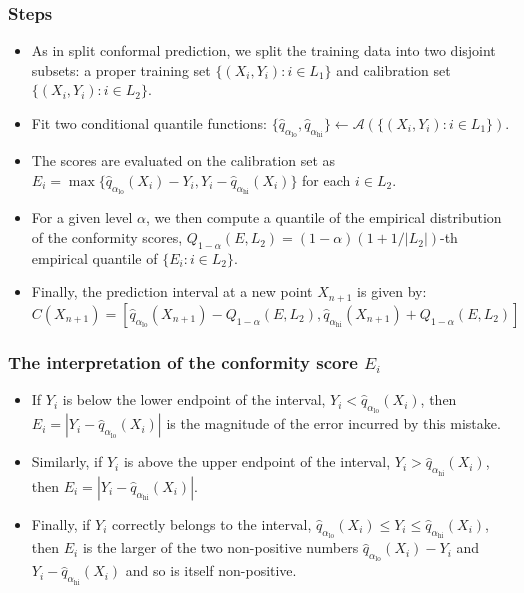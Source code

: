 \documentclass[11pt,a4paper]{article}
\begin{document}
\subsubsection{Steps}
\begin{itemize}
    \item As in split conformal prediction, we split the training data into two disjoint subsets: a proper training set \mbox{$\{(X_i, Y_i) : i \in L_1\}$} and calibration set $\{(X_i, Y_i) : i \in L_2\}$.
    \item Fit two conditional quantile functions: $\{\hat{q}_{\alpha_{\text{lo}}}, \hat{q}_{\alpha_{\text{hi}}}\} \leftarrow \mathcal{A}(\{(X_i, Y_i) : i \in L_1\})$.
    \item The scores are evaluated on the calibration set as $E_i = \max\{\hat{q}_{\alpha_{\text{lo}}}(X_i) - Y_i, Y_i - \hat{q}_{\alpha_{\text{hi}}}(X_i)\}$ for each $i \in L_2$.
    \item For a given level $\alpha$, we then compute a quantile of the empirical distribution of the conformity scores, $Q_{1-\alpha}(E, L_2) = (1 - \alpha)(1 + 1/|L_2|)$-th empirical quantile of $\{E_i : i \in L_2\}$.
    \item Finally, the prediction interval at a new point $X_{n+1}$ is given by:
    \[ C(X_{n+1}) = [\hat{q}_{\alpha_{\text{lo}}}(X_{n+1}) - Q_{1-\alpha}(E, L_2), \hat{q}_{\alpha_{\text{hi}}}(X_{n+1}) + Q_{1-\alpha}(E, L_2)] \]
\end{itemize}

\subsubsection{The interpretation of the conformity score $E_i$}
\begin{itemize}
    \item If $Y_i$ is below the lower endpoint of the interval, $Y_i < \hat{q}_{\alpha_{\text{lo}}}(X_i)$, then $E_i = |Y_i - \hat{q}_{\alpha_{\text{lo}}}(X_i)|$ is the magnitude of the error incurred by this mistake.
    \item Similarly, if $Y_i$ is above the upper endpoint of the interval, $Y_i > \hat{q}_{\alpha_{\text{hi}}}(X_i)$, then $E_i = |Y_i - \hat{q}_{\alpha_{\text{hi}}}(X_i)|$.
    \item Finally, if $Y_i$ correctly belongs to the interval, $\hat{q}_{\alpha_{\text{lo}}}(X_i) \le Y_i \le \hat{q}_{\alpha_{\text{hi}}}(X_i)$, then $E_i$ is the larger of the two non-positive numbers $\hat{q}_{\alpha_{\text{lo}}}(X_i) - Y_i$ and $Y_i - \hat{q}_{\alpha_{\text{hi}}}(X_i)$ and so is itself non-positive.
\end{itemize}
\end{document}
